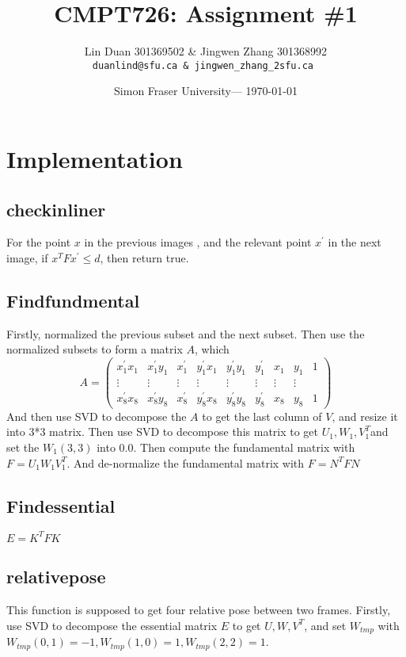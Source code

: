 \documentclass{article}
\title{CMPT726: Assignment \#1} %
\author{Lin Duan 301369502 \& Jingwen Zhang 301368992 \\ \texttt{duanlind@sfu.ca \& jingwen\_zhang\_2sfu.ca }} %
\date{Simon Fraser University--- \today} %
\begin{document}
	
	\maketitle %
	
	
	\section{Implementation} 
	\subsection{checkinliner} 
	For the point $x$ in the previous images , and the relevant point $x^{'}$ in the next image,  if $x^{T} F x^{'} \leq  d$, then return true.
	\subsection{Findfundmental}
	Firstly, normalized the previous subset and the next subset. Then use the normalized subsets to form a matrix $A$, which $$A = \begin{pmatrix}
	x_{1}^{'}x_{1} & x_{1}^{'}y_{1} & x_{1}^{'} & y_{1}^{'}x_{1} & y_{1}^{'}y_{1} & y_{1}^{'} & x_1 & y_1 & 1 \\
	\vdots & \vdots & \vdots & \vdots & \vdots & \vdots & \vdots & \vdots  \\
	x_{8}^{'}x_{8} & x_{8}^{'}y_{8} & x_{8}^{'} & y_{8}^{'}x_{8} & y_{8}^{'}y_{8} & y_{8}^{'} & x_8 & y_8 & 1
	\end{pmatrix}$$
	And then use SVD to decompose the $A$ to get the last column of $V$, and resize it into 3*3 matrix. Then use SVD to decompose this matrix to get $U_1, W_1, V_{1}^{T}$and set the $W_1(3,3)$ into 0.0. Then compute the fundamental matrix with $F= U_1 W_1 V_{1}^{T}$. And de-normalize the fundamental matrix with $F = N^{T}FN$
	
	\subsection{Findessential}
	$E = K^{T} F K$
	\subsection{relativepose}
	This function is supposed to get four relative pose between two frames. Firstly, use SVD to decompose the essential matrix $E$ to get $U, W, V^{T}$, and set $W_{tmp}$ with $W_{tmp}(0,1) = -1, W_{tmp}(1,0) = 1, W_{tmp}(2,2) = 1$. 
	
\end{document}
